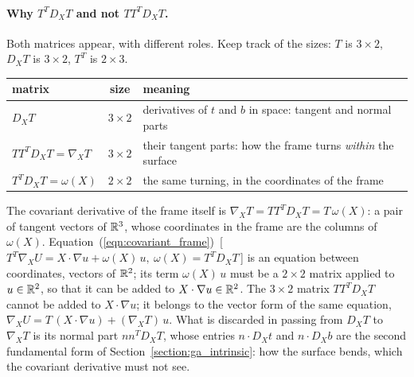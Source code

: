 \paragraph{Why $T^T D_X T$ and not $T T^T D_X T$.} Both matrices appear, with different roles. Keep track of the sizes: $T$ is $3\times 2$, $D_X T$ is $3 \times 2$, $T^T$ is $2 \times 3$.
\begin{center}
\footnotesize
\begin{tabular}{l c l}
\toprule
matrix & size & meaning \\
\midrule
$D_X T$ & $3 \times 2$ & derivatives of $t$ and $b$ in space: tangent and normal parts \\
$T T^T D_X T = \nabla_X T$ & $3 \times 2$ & their tangent parts: how the frame turns \emph{within} the surface \\
$T^T D_X T = \omega(X)$ & $2 \times 2$ & the same turning, in the coordinates of the frame \\
\bottomrule
\end{tabular}
\end{center}
The covariant derivative of the frame itself is $\nabla_X T = T T^T D_X T = T\, \omega(X)$: a pair of tangent vectors of $\mathbb{R}^3$, whose coordinates in the frame are the columns of $\omega(X)$. Equation~(\ref{eqn:covariant_frame})~[\,$T^T\nabla_X U = X\cdot\nabla u + \omega(X)\,u,\ \omega(X) = T^TD_XT$\,] is an equation between coordinates, vectors of $\mathbb{R}^2$; its term $\omega(X)\, u$ must be a $2 \times 2$ matrix applied to $u \in \mathbb{R}^2$, so that it can be added to $X \cdot \nabla u \in \mathbb{R}^2$. The $3 \times 2$ matrix $T T^T D_X T$ cannot be added to $X\cdot\nabla u$; it belongs to the vector form of the same equation, $\nabla_X U = T\,(X\cdot\nabla u) + (\nabla_X T)\, u$. What is discarded in passing from $D_X T$ to $\nabla_X T$ is its normal part $n n^T D_X T$, whose entries $n \cdot D_X t$ and $n \cdot D_X b$ are the second fundamental form of Section~\ref{section:ga_intrinsic}: how the surface bends, which the covariant derivative must not see.

